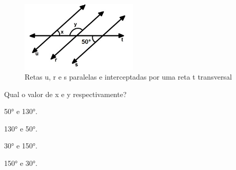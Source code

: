 \begin{escolha}
\begin{escolha}
\begin{escolha}
\begin{escolha}
{\begin{boxmedio}
\begin{boxpeq}
\begin{q°}
\begin{boxmedio}
\begin{boxpeq}
\begin{boxpeq}
\begin{boxmedio}
\begin{boxmedio}
\begin{boxmedio}
\begin{largebox}
\begin{boxmedio}
{\begin{enumerate}
\begin{boxpeq}
{\begin{boxpeq}
\begin{boxpeq}
\begin{boxmedio}
\begin{boxpeq}
\begin{boxpeq}
\begin{boxpeq}
\begin{escolha}
\begin{escolha}
\begin{figure}
\centering
\includegraphics[width=2.19271in,height=1.32816in]{./_SAEB_9_MAT/media/image248.jpeg}
\caption{Retas u, r e s paralelas e interceptadas por uma reta t
transversal}
\end{figure}

Qual o valor de x e y respectivamente?

\begin{escolha}

  \item 50° e 130°.

  \item 130° e 50°.

  \item 30° e 150°.

  \item 150° e 30°.

\end{escolha}

\end{escolha}
\end{escolha}
\end{boxpeq}
\end{boxpeq}
\end{boxpeq}
\end{boxmedio}
\end{boxpeq}
\end{boxpeq}}
\end{boxpeq}
\end{enumerate}}
\end{boxmedio}
\end{largebox}
\end{boxmedio}
\end{boxmedio}
\end{boxmedio}
\end{boxpeq}
\end{boxpeq}
\end{boxmedio}
\end{q°}
\end{boxpeq}
\end{boxmedio}}
\end{escolha}
\end{escolha}
\end{escolha}
\end{escolha}
